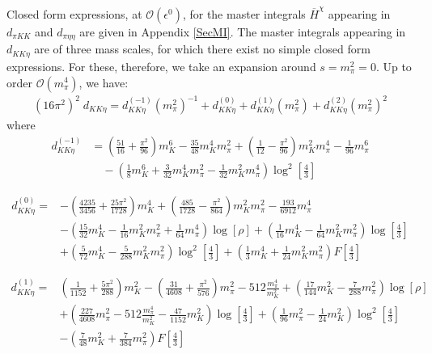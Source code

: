 \documentclass[12pt,a4paper]{article}
\begin{document}
Closed form expressions, at $\mathcal{O}(\epsilon^0)$, for the master integrals $\overline{H}^{\chi}$ appearing in ${d}_{\pi K K}$ and ${d}_{\pi \eta \eta}$ are given in Appendix \ref{SecMI}. The master integrals appearing in ${d}_{K K \eta}$ are of three mass scales, for which there exist no simple closed form expressions. For these, therefore, we take an expansion around $s=m_{\pi}^2=0$. Up to order $\mathcal{O} \left(m_{\pi}^4\right)$, we have:
\begin{align}
\label{dkkeapprox}
	(16 \pi^2)^2 \; {d}_{K K \eta} = {d}_{K K \eta}^{(-1)} (m_{\pi}^2)^{-1} + {d}_{K K \eta}^{(0)} + {d}_{K K \eta}^{(1)} (m_{\pi}^2) + {d}_{K K \eta}^{(2)} (m_{\pi}^2)^2 
\end{align}
where
\begin{align}
	{d}_{K K \eta}^{(-1)} &= \left(\frac{51}{16}+\frac{\pi ^2}{96}\right) m_{K}^6 - \frac{35}{48} m_{K}^4 m_{\pi}^2 +\left(\frac{1}{12}-\frac{\pi^2}{96}\right) m_{K}^2 m_{\pi}^4 -\frac{1}{96} m_{\pi}^6
\nonumber \\
	& \quad - \left(\frac{1}{8} m_{K}^6 + \frac{3}{32} m_{K}^4 m_{\pi}^2 - \frac{1}{32} m_{K}^2 m_{\pi}^4 \right) \log^2 \left[ \frac{4}{3} \right]
\end{align}

\begin{align}
	{d}_{K K \eta}^{(0)} =&  - \left(\frac{4235}{3456}+\frac{25 \pi ^2}{1728}\right) m_{K}^4 + \left(\frac{485}{1728}-\frac{\pi ^2}{864}\right) m_{K}^2 m_{\pi}^2 - \frac{193}{6912} m_{\pi}^4 \nonumber \\
	&  - \left(\frac{15}{32} m_{K}^4 - \frac{1}{16} m_{K}^2 m_{\pi}^2 + \frac{1}{64} m_{\pi}^4 \right) \log [\rho] + \left(\frac{1}{16} m_{K}^4 -\frac{1}{64} m_{K}^2 m_{\pi}^2 \right) \log \left[ \frac{4}{3} \right] \nonumber \\
	&  + \left(\frac{5}{72} m_{K}^4 - \frac{5}{288}  m_{K}^2 m_{\pi}^2 \right) \log^2 \left[ \frac{4}{3} \right]  + \left(\frac{1}{3} m_{K}^4 + \frac{1}{24} m_{K}^2 m_{\pi}^2 \right) F \left[ \frac{4}{3} \right]
\end{align}

\begin{align}
	{d}_{K K \eta}^{(1)} =& \left(\frac{1}{1152}+\frac{5 \pi ^2}{288}\right) m_{K}^2-\left(\frac{31}{4608}+\frac{\pi ^2}{576}\right) m_{\pi}^2 -512  \frac{m_{\pi}^4}{m_{K}^2}  + \left(\frac{17}{144} m_{K}^2 - \frac{7}{288} m_{\pi}^2 \right) \log [\rho]
\nonumber \\
	& + \left( \frac{227}{4608} m_{\pi}^2 - 512 \frac{m_{\pi}^4}{m_{K}^2} - \frac{47}{1152} m_{K}^2 \right) \log \left[\frac{4}{3}\right]  + \left(\frac{1}{96} m_{\pi}^2 - \frac{1}{24} m_{K}^2 \right) \log^2 \left[ \frac{4}{3} \right] \nonumber \\
	& - \left(\frac{7}{48} m_{K}^2 + \frac{7}{384} m_{\pi}^2 \right) F \left[\frac{4}{3}\right]
\end{align}
\end{document}
